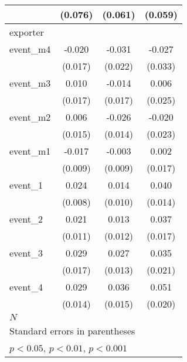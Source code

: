 \begin{table}[htbp]
\begin{tabular}{l*{3}{c}}
            &     (0.076)         &     (0.061)         &     (0.059)         \\
\hline
exporter    &                     &                     &                     \\
event\_m4    &      -0.020         &      -0.031         &      -0.027         \\
            &     (0.017)         &     (0.022)         &     (0.033)         \\
[1em]
event\_m3    &       0.010         &      -0.014         &       0.006         \\
            &     (0.017)         &     (0.017)         &     (0.025)         \\
[1em]
event\_m2    &       0.006         &      -0.026         &      -0.020         \\
            &     (0.015)         &     (0.014)         &     (0.023)         \\
[1em]
event\_m1    &      -0.017         &      -0.003         &       0.002         \\
            &     (0.009)         &     (0.009)         &     (0.017)         \\
[1em]
event\_1     &       0.024\sym{**} &       0.014         &       0.040\sym{**} \\
            &     (0.008)         &     (0.010)         &     (0.014)         \\
[1em]
event\_2     &       0.021         &       0.013         &       0.037\sym{*}  \\
            &     (0.011)         &     (0.012)         &     (0.017)         \\
[1em]
event\_3     &       0.029         &       0.027\sym{*}  &       0.035         \\
            &     (0.017)         &     (0.013)         &     (0.021)         \\
[1em]
event\_4     &       0.029\sym{*}  &       0.036\sym{*}  &       0.051\sym{*}  \\
            &     (0.014)         &     (0.015)         &     (0.020)         \\
\hline
\(N\)       &                     &                     &                     \\
\hline\hline
\multicolumn{4}{l}{\footnotesize Standard errors in parentheses}\\
\multicolumn{4}{l}{\footnotesize \sym{*} \(p<0.05\), \sym{**} \(p<0.01\), \sym{***} \(p<0.001\)}\\
\end{tabular}
\end{table}
